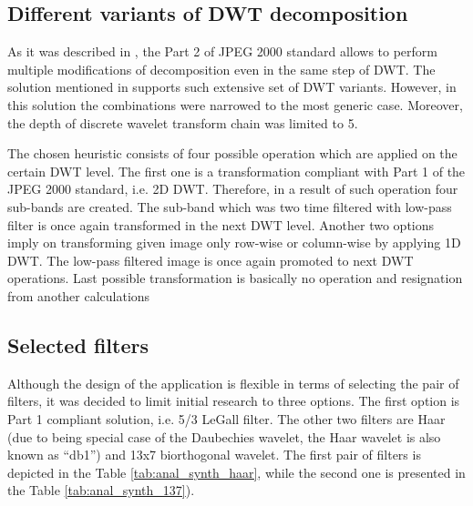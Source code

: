 \subsection{Different variants of DWT decomposition} \label{sec:dwt_decompositions}

As it was described in , the Part 2 of JPEG 2000 standard allows to perform
multiple modifications of decomposition even in the same step of DWT. The solution mentioned in  supports
such extensive set of DWT variants. However, in this solution the combinations were narrowed to the most
generic case. Moreover, the depth of discrete wavelet transform chain was limited to 5.

The chosen heuristic consists of four possible operation which are applied on the certain DWT level.
The first one is a transformation compliant with Part 1 of the JPEG 2000 standard, i.e. 2D DWT. Therefore, in a result
of such operation four sub-bands are created. The sub-band which was two time filtered with low-pass filter
is once again transformed in the next DWT level. Another two options imply on transforming given image only
row-wise or column-wise by applying 1D DWT. The low-pass filtered image is once again promoted to next DWT operations.
Last possible transformation is basically no operation and resignation from another calculations

\subsection{Selected filters}

Although the design of the application is flexible in terms of selecting the pair of filters, it was decided
to limit initial research to three options. The first option is Part 1 compliant solution, i.e. 5/3 LeGall filter.
The other two filters are Haar (due to being special case of the Daubechies wavelet, the Haar wavelet is also
known as ``db1'') and 13x7 biorthogonal wavelet. The first pair of filters is depicted in the Table \ref{tab:anal_synth_haar},
while the second one is presented in the Table \ref{tab:anal_synth_137}).


